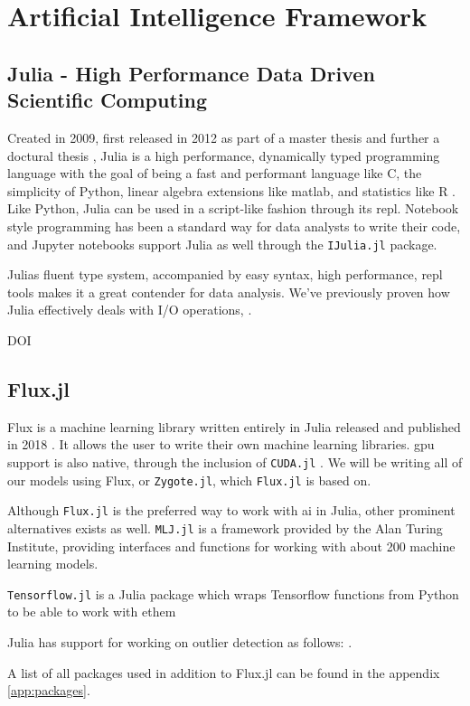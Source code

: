 \section{Artificial Intelligence Framework}

\subsection{Julia - High Performance Data Driven Scientific Computing}

Created in 2009, first released in 2012 as part of a master thesis \cite{juliaMs} and further a doctural thesis \cite{juliaPHD}, Julia is a high performance, dynamically typed programming language with the goal of being a fast and performant language like C, the simplicity of Python, linear algebra extensions like matlab, and statistics like R \cite{julia}.  \\ 

Like Python, Julia can be used in a script-like fashion through its \acrfull{repl}. Notebook style programming has been a standard way for data analysts to write their code, and Jupyter notebooks support Julia as well through the \texttt{IJulia.jl} package. 

Julias fluent type system, accompanied by easy syntax, high performance, \acrshort{repl} tools makes it a great contender for data analysis. We've previously proven how Julia effectively deals with I/O operations, \cite{projthesis}.


DOI \cite{doi:10.1137/141000671}

\subsection{Flux.jl}
\label{back:flux}

Flux is a machine learning library written entirely in Julia released and published in 2018 \cite{Flux.jl-2018, Innes2018}. It allows the user to write their own machine learning libraries. \acrshort{gpu} support is also native, through the inclusion of \texttt{CUDA.jl} \cite{Besard_2019}. We will be writing all of our models using Flux, or \texttt{Zygote.jl}, which \texttt{Flux.jl} is based on. 

Although \texttt{Flux.jl} is the preferred way to work with \acrshort{ai} in Julia, other prominent alternatives exists as well. \texttt{MLJ.jl} \cite{blaom2020flexible} \cite{Blaom2020} is a framework provided by the Alan Turing Institute\texttrademark, providing interfaces and functions for working with about 200 machine learning models. 

\texttt{Tensorflow.jl} is a Julia package which wraps Tensorflow functions from Python to be able to work with ethem

Julia has support for working on outlier detection as follows: \cite{muhr2022outlierdetectionjl}.

A list of all packages used in addition to Flux.jl can be found in the appendix \ref{app:packages}.
